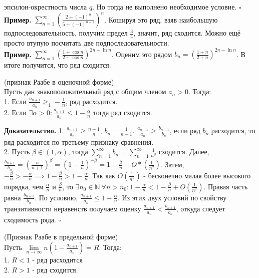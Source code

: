 эпсилон-окрестность числа $q$. Но тогда не выполнено необходимое условие. 
$\square$ \\
\textbf{Пример.} $\sum\limits_{n=1}^{\infty} \left(\frac{2+(-1)^{n}}
{5+(-1)^{n+1}}\right)^n$. Кошируя это ряд, взяв наибольшую
подпоследовательность, получим предел $\frac{3}{4}$, значит, ряд сходится. 
Можно ещё просто втупую посчитать две подпоследовательности. \\
\textbf{Пример.} $\sum\limits_{n=1}^{\infty}\left(\frac{1+\cos{n}}{2+\cos{n}}
\right)^{2n-\ln{n}}$. Оценим это рядом $b_n=\left(\frac{1+n}{2+n}\right)^{2n
-\ln{n}}$. В итоге получится, что ряд сходится.
\begin{theor}
    (признак Раабе в оценочной форме)\\
    Пусть дан знакоположительный ряд с общим членом $a_n>0$. Тогда:\\
    1. Если $\frac{a_{n+1}}{a_n}\geqslant_1-\frac{1}{n}$, ряд расходится.\\
    2. Если $\exists \alpha>0: \frac{a_{n+1}}{a_n}\leqslant 1-\frac{\alpha}{n}$ тогда ряд сходится. 
\end{theor}
\textbf{Доказательство.}  1. $\frac{a_{n+1}}{a_n}\geqslant \frac{n-1}{n}$,
$b_n=\frac{1}{n-1}$. $\frac{a_{n+1}}{a_n}\geqslant\frac{b_{n+1}}{b_n}$, 
если ряд $b_n$ расходится, то ряд расходится по третьему признаку сравнения.\\
2. Пусть  $\beta\in(1,\alpha)$, тогда $\sum\limits_{n=1}^{\infty} b_n=
\sum\limits_{n=1}^{\infty} \frac{1}{n^\beta}$ сходится. Далее,
$\frac{b_{n+1}}{b_n}=(\frac{n}{n+1})^\beta=(1-\frac{1}{n})^{-\beta}=
1-\frac{\beta}{n}+O*(\frac{1}{n^2})$. Затем, $- \frac{\beta}{n}>- 
\frac{\alpha}{n}\implies 1-\frac{\beta}{n}>1-\frac{\alpha}{n}$.
Так как $O(\frac{1}{n^2})$ - бесконечно малая более высокого порядка, чем 
$\frac{\alpha}{n}$ и $\frac{\beta}{n}$, то $\exists n_0\in\mathbb{N}~\forall
n>n_0:1-\frac{\alpha}{n}<1-\frac{\beta}{n}+O(\frac{1}{n^2})$. Правая часть
равна $\frac{b_{n+1}}{b_n}$. По условию, $\frac{a_{n+1}}{a_n}\leqslant 
1-\frac{\alpha}{n}$. Из этих двух условий по свойству транзитивности 
неравенств получаем оценку $\frac{a_{n+1}}{a_n}<\frac{b_{n+1}}{b_n}$, откуда 
следует сходимость ряда. $\square$ 
\begin{theor}
    (Признак Раабе в предельной форме)\\
    Пусть $\lim\limits_{n \to \infty}n(1-\frac{a_{n+1}}{a_n})=R$. 
    Тогда:\\
    1. $R<1$ - ряд расходится\\
    2. $R>1$ - ряд сходится. 
\end{theor}

